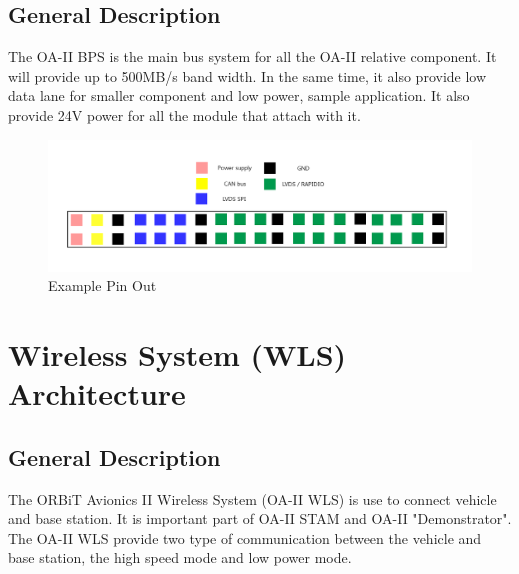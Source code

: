 \documentclass[12pt,article]{memoir}
\begin{document}
\section{General Description}
The OA-II BPS is the main bus system for all the OA-II relative component. It will provide up to 500MB/s band width. In the same time, it also provide low data lane for smaller component and low power, sample application. It also provide 24V power for all the module that attach with it.
\begin{figure}[h]
\includegraphics[width=\textwidth]{BPS_Pin.png}
 \caption{Example Pin Out}	
\end{figure}

\newpage

\chapter{Wireless System (WLS) Architecture}
\section{General Description}
The ORBiT Avionics II Wireless System (OA-II WLS) is use to connect vehicle and base station. It is important part of OA-II STAM and OA-II "Demonstrator". The OA-II WLS provide two type of communication between the vehicle and base station, the high speed mode and low power mode.
\end{document}
